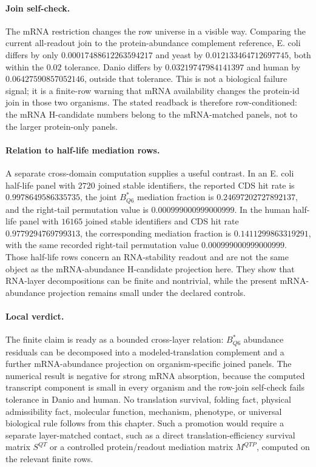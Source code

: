 \paragraph{Join self-check.} The mRNA restriction changes the row universe in a visible way.  Comparing the current all-readout join to the protein-abundance complement reference, E. coli differs by only $0.00017488612263594217$ and yeast by $0.012133464712697745$, both within the $0.02$ tolerance.  Danio differs by $0.03219747984141397$ and human by $0.06427590857052146$, outside that tolerance.  This is not a biological failure signal; it is a finite-row warning that mRNA availability changes the protein-id join in those two organisms.  The stated readback is therefore row-conditioned: the mRNA H-candidate numbers belong to the mRNA-matched panels, not to the larger protein-only panels.

\paragraph{Relation to half-life mediation rows.} A separate cross-domain computation supplies a useful contrast.  In an E. coli half-life panel with $2720$ joined stable identifiers, the reported CDS hit rate is $0.9978649586335735$, the joint $B^*_{Q6}$ mediation fraction is $0.24697202727892137$, and the right-tail permutation value is $0.000999000999000999$.  In the human half-life panel with $16165$ joined stable identifiers and CDS hit rate $0.9779294769799313$, the corresponding mediation fraction is $0.1411299863319291$, with the same recorded right-tail permutation value $0.000999000999000999$.  Those half-life rows concern an RNA-stability readout and are not the same object as the mRNA-abundance H-candidate projection here.  They show that RNA-layer decompositions can be finite and nontrivial, while the present mRNA-abundance projection remains small under the declared controls.

\paragraph{Local verdict.} The finite claim is ready as a bounded cross-layer relation: $B^*_{Q6}$ abundance residuals can be decomposed into a modeled-translation complement and a further mRNA-abundance projection on organism-specific joined panels.  The numerical result is negative for strong mRNA absorption, because the computed transcript component is small in every organism and the row-join self-check fails tolerance in Danio and human.  No translation survival, folding fact, physical admissibility fact, molecular function, mechanism, phenotype, or universal biological rule follows from this chapter.  Such a promotion would require a separate layer-matched contact, such as a direct translation-efficiency survival matrix $S^{QT}$ or a controlled protein/readout mediation matrix $M^{QTP}$, computed on the relevant finite rows.